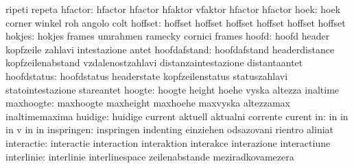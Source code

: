                            ripeti                    repeta
                  hfactor: hfactor                   hfactor
                           hfaktor                   vfaktor
                           hfactor                   hfactor  %
                     hoek: hoek                      corner
                           winkel                    roh
                           angolo                    colt
                  hoffset: hoffset                   hoffset
                           hoffset                   hoffset
                           hoffset                   hoffset %
                   hokjes: hokjes                    frames
                           umrahmen                  ramecky
                           cornici                   frames
                    hoofd: hoofd                     header
                           kopfzeile                 zahlavi
                           intestazione              antet
             hoofdafstand: hoofdafstand              headerdistance
                           kopfzeilenabstand         vzdalenostzahlavi
                           distanzaintestazione      distantaantet
              hoofdstatus: hoofdstatus               headerstate
                           kopfzeilenstatus          statuszahlavi
                           statointestazione         stareantet
                   hoogte: hoogte                    height
                           hoehe                     vyska
                           altezza                   inaltime
                maxhoogte: maxhoogte                 maxheight
                           maxhoehe                  maxvyska
                           altezzamax                inaltimemaxima
                  huidige: huidige                   current
                           aktuell                   aktualni
                           corrente                  curent
                       in: in                        in
                           in                        v
                           in                        in
               inspringen: inspringen                indenting
                           einziehen                 odsazovani
                           rientro                   aliniat
               interactie: interactie                interaction
                           interaktion               interakce
                           interazione               interactiune
               interlinie: interlinie                interlinespace
                           zeilenabstande            meziradkovamezera
